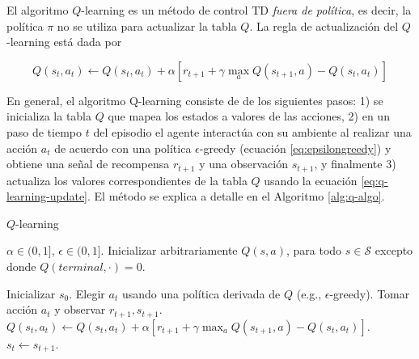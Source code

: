 
El algoritmo $Q$-learning \cite{watkins1992q} es un método de control TD \textit{fuera de política}, es decir,
la política $\pi$ no se utiliza para actualizar la tabla $Q$. 
La regla de actualización del $Q$-learning está dada por 

\begin{equation}\label{eq:q-learning-update}
Q(s_t, a_t) \leftarrow Q(s_t, a_t) + \alpha[r_{t+1} + \gamma \max_a Q(s_{t+1}, a) - Q(s_t, a_t)]
\end{equation}

En general, el algoritmo Q-learning consiste de de los siguientes pasos:
1) se inicializa la tabla $Q$ que mapea los estados a valores de las acciones,
2) en un paso de tiempo $t$ del episodio el agente interactúa con su ambiente al realizar una acción $a_t$ de acuerdo con una política $\epsilon$-greedy (ecuación \ref{eq:epsilongreedy}) y obtiene una señal de recompensa $r_{t+1}$ y una observación $s_{t+1}$, y finalmente 3) actualiza los valores
correspondientes de la tabla $Q$ usando la ecuación \ref{eq:q-learning-update}. El método
se explica a detalle en el Algoritmo \ref{alg:q-algo}.

\begin{mialgoritmo}[H]
  	\caption{$Q$-learning}
	\label{alg:q-algo}
  \begin{algorithmic}[1]
  \REQUIRE $\alpha \in (0,1]$, $\epsilon \in (0, 1]$.
  \STATE Inicializar arbitrariamente $Q(s,a)$, para todo $s\in \mathcal{S}$ excepto donde $Q(terminal, \cdot) = 0$.
  
    \STATE Inicializar $s_0$.
    \STATE Elegir $a_t$ usando una política derivada de $Q$ (e.g., $\epsilon$-greedy).
    \STATE Tomar acción $a_t$ y observar $r_{t+1}, s_{t+1}$.
    \STATE $Q(s_t, a_t) \leftarrow Q(s_t, a_t) + \alpha [r_{t+1} + \gamma \max_a Q(s_{t+1}, a) - Q(s_t, a_t)]$.
    \STATE $s_t \leftarrow s_{t+1}$.
    \ENDFOR
  \ENDFOR
  \end{algorithmic}
\end{mialgoritmo}

